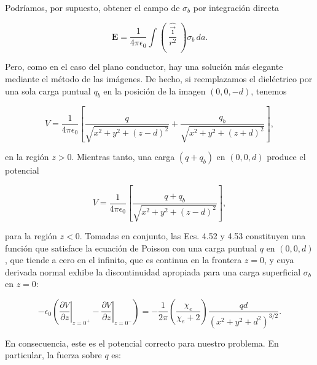 \documentclass[12pt,a4paper]{report}
\newcommand{\esp}{\vspace{0.5cm}}
\begin{document}
	Podríamos, por supuesto, obtener el campo de $\sigma_b$ por integración directa
	
	\esp
	
	\begin{equation}
		\mathbf{E} = \frac{1}{4\pi\epsilon_0} \int \left( \frac{\hat{\vec{\imath}}}{r^2} \right) \sigma_b \, da.
	\end{equation}
	
	\esp
	
	\noindent Pero, como en el caso del plano conductor, hay una solución más elegante mediante el método de las imágenes. De hecho, si reemplazamos el dieléctrico por una sola carga puntual $q_b$ en la posición de la imagen $(0, 0, -d)$, tenemos
	
	\esp
	
	\begin{equation}
		V = \frac{1}{4\pi\epsilon_0} \left[ \frac{q}{\sqrt{x^2 + y^2 + (z - d)^2}} + \frac{q_b}{\sqrt{x^2 + y^2 + (z + d)^2}} \right],
	\end{equation}
	
	\esp
	
	\noindent en la región $z > 0$. Mientras tanto, una carga $(q + q_b)$ en $(0, 0, d)$ produce el potencial
	
	\esp
	
	\begin{equation}
		V = \frac{1}{4\pi\epsilon_0} \left[ \frac{q + q_b}{\sqrt{x^2 + y^2 + (z - d)^2}} \right],
	\end{equation}
	
	\esp
	
	\noindent para la región $z < 0$. Tomadas en conjunto, las Ecs. 4.52 y 4.53 constituyen una función que satisface la ecuación de Poisson con una carga puntual $q$ en $(0, 0, d)$, que tiende a cero en el infinito, que es continua en la frontera $z = 0$, y cuya derivada normal exhibe la discontinuidad apropiada para una carga superficial $\sigma_b$ en $z = 0$:
	
	\esp
	
	\begin{equation}
		-\epsilon_0 \left( \left. \frac{\partial V}{\partial z} \right|_{z=0^+} - \left. \frac{\partial V}{\partial z} \right|_{z=0^-} \right) = -\frac{1}{2\pi} \left( \frac{\chi_e}{\chi_e + 2} \right) \frac{qd}{(x^2 + y^2 + d^2)^{3/2}}.
	\end{equation}
	
	\esp
	
	\noindent En consecuencia, este es el potencial correcto para nuestro problema. En particular, la fuerza sobre $q$ es:
	
\end{document}
